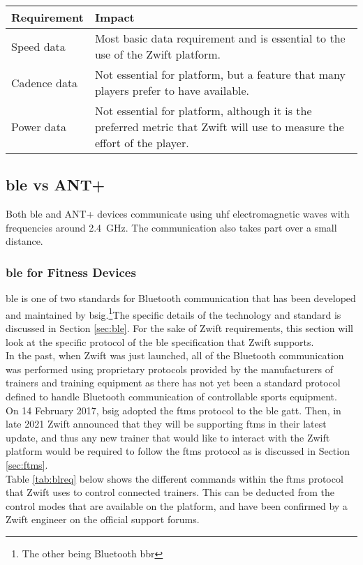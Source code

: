 \begin{table}[h!]
	\renewcommand{\arraystretch}{1.5}
	\centering
	\begin{tabularx}{0.8\textwidth}{ p{3cm} X}
		\toprule
		Requirement & Impact \\
		\midrule
		Speed data & Most basic data requirement and is essential to the use of the Zwift platform.\\
		Cadence data & Not essential for platform, but a feature that many players prefer to have available.\\
		Power data & Not essential for platform, although it is the preferred metric that Zwift will use to measure the effort of the player.\\
		\bottomrule
	\end{tabularx}
\end{table}

\subsection{\ac{ble} vs ANT+}
Both \ac{ble} and ANT+ devices communicate using \ac{uhf} electromagnetic waves with frequencies around \SI{2.4}{\giga\hertz}. The communication also takes part over a small distance.

\subsubsection{\ac{ble} for Fitness Devices}
\ac{ble} is one of two standards for Bluetooth communication that has been developed and maintained by \ac{bsig}.\footnote{The other being Bluetooth \ac{bbr}}The specific details of the technology and standard is discussed in Section \ref{sec:ble}. For the sake of Zwift requirements, this section will look at the specific protocol of the \ac{ble} specification that Zwift supports.\\
In the past, when Zwift was just launched, all of the Bluetooth communication was performed using proprietary protocols provided by the manufacturers of trainers and training equipment as there has not yet been a standard protocol defined to handle Bluetooth communication of controllable sports equipment. \\
On 14 February 2017, \ac{bsig} adopted the \ac{ftms} protocol to the \ac{ble} \ac{gatt}. Then, in late 2021 Zwift announced that they will be supporting \ac{ftms} in their latest update, and thus any new trainer that would like to interact with the Zwift platform would be required to follow the \ac{ftms} protocol as is discussed in Section \ref{sec:ftms}. \citep{Jeremy:2021}\\
Table \ref{tab:blreq} below shows the different commands within the \ac{ftms} protocol that Zwift uses to control connected trainers. This can be deducted from the control modes that are available on the platform, and have been confirmed by a Zwift engineer on the official support forums.

